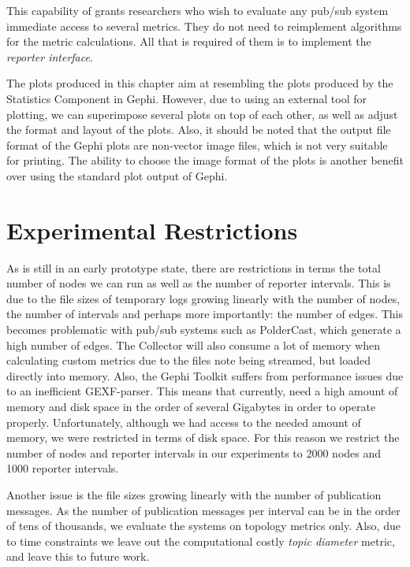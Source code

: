 This capability of \demo{} grants researchers who wish to evaluate
any pub/sub system immediate access to several metrics. They do not need to
reimplement algorithms for the metric calculations. All that is
required of them is to implement the \emph{reporter interface}.

The plots produced in this chapter aim at resembling the plots produced
by the Statistics Component in Gephi. However, due to using an external
tool for plotting, we can superimpose several plots on top of each
other, as well as adjust the format and layout of the plots. Also, it
should be noted that the output file format of the Gephi plots are
non-vector image files, which is not very suitable for printing. The
ability to choose the image format of the plots is another benefit over
using the standard plot output of Gephi.

\section{Experimental Restrictions}

As \demo{} is still in an early prototype state, there are restrictions
in terms the total number of nodes we can run as well as the number of
reporter intervals. This is due to the file sizes of temporary logs
growing linearly with the number of nodes, the number of intervals and perhaps more
importantly: the number of edges. This becomes problematic with pub/sub
systems such as PolderCast, which generate a high number of edges. The
Collector will also consume a lot of memory when calculating custom metrics
due to the files note being streamed, but loaded directly into
memory. Also, the Gephi Toolkit suffers
from performance issues due to an inefficient GEXF-parser. This means
that currently, \demo{} need a high amount of memory and disk space in
the order of several Gigabytes in order to operate properly.
Unfortunately, although we had access to the needed amount of memory, we
were restricted in terms of disk space. For this reason we restrict the
number of nodes and reporter intervals in our experiments to 2000 nodes
and 1000 reporter intervals.

Another issue is the file sizes growing linearly with the number of
publication messages. As the number of publication messages per interval
can be in the order of tens of thousands,  we evaluate the systems on
topology metrics only. Also, due to time constraints we leave out the
computational costly \emph{topic diameter} metric, and leave this to
future work.

